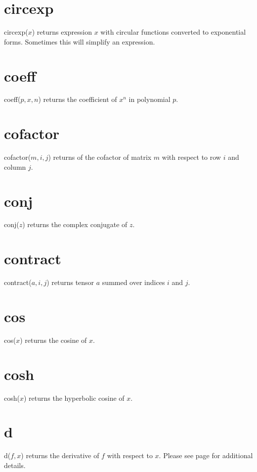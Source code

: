\documentclass[12pt,openany]{report}
\begin{document}
\section*{circexp}
circexp($x$) returns expression $x$ with circular functions converted
to exponential forms.
Sometimes this will simplify an expression.

\section*{coeff}
coeff($p,x,n$) returns the coefficient of $x^n$ in polynomial $p$.

\section*{cofactor}
cofactor($m,i,j$) returns of the cofactor of matrix $m$ with respect to row $i$ and column $j$.

\section*{conj}
conj($z$) returns the complex conjugate of $z$.

\section*{contract}
contract($a,i,j$) returns tensor $a$ summed over indices $i$ and $j$.

\section*{cos}
cos($x$) returns the cosine of $x$.

\section*{cosh}
cosh($x$) returns the hyperbolic cosine of $x$.

\section*{d}
d($f,x$) returns the derivative of $f$ with respect to $x$.
Please see page \pageref{d} for additional details.
\end{document}
